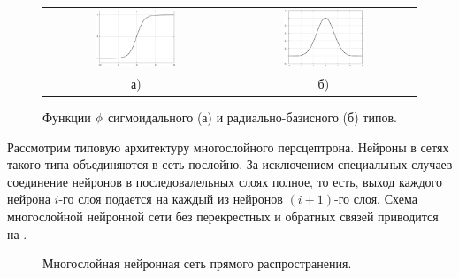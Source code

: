 \begin{figure}[h]
\centering
\begin{tabular}{cc}
\includegraphics[width=0.45\textwidth,%
  totalheight=0.25\textheight]{tanh} &
\includegraphics[width=0.45\textwidth,%
  totalheight=0.25\textheight]{rbf} \\
а) & б)\\
\end{tabular}
\caption{Функции $\phi$ сигмоидального (а) и радиально-базисного (б) типов.}
\label{fig:act_func}
\end{figure}

Рассмотрим типовую архитектуру многослойного персцептрона.  Нейроны в
сетях такого типа объединяются в сеть послойно.  За исключением
специальных случаев соединение нейронов в последовалельных слоях
полное, то есть, выход каждого нейрона $i$-го слоя подается на каждый
из нейронов $(i+1)$-го слоя.  Схема многослойной нейронной сети без
перекрестных и обратных связей приводится на .

\begin{figure}[h]
\centering
%

\caption{Многослойная нейронная сеть прямого распространения.}
\label{fig:mlann}
\end{figure}

